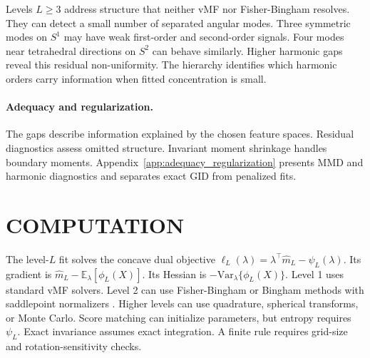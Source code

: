 \documentclass[twoside]{article}
\theoremstyle{definition}
\theoremstyle{remark}
\newcommand{\E}{\mathbb E}
\begin{document}
Levels $L\ge3$ address structure that neither vMF nor Fisher-Bingham resolves. They can detect a small number of separated angular modes. Three symmetric modes on $S^1$ may have weak first-order and second-order signals. Four modes near tetrahedral directions on $S^2$ can behave similarly. Higher harmonic gaps reveal this residual non-uniformity. The hierarchy identifies which harmonic orders carry information when fitted concentration is small.

\paragraph{Adequacy and regularization.}
The gaps describe information explained by the chosen feature spaces. Residual diagnostics assess omitted structure. Invariant moment shrinkage handles boundary moments. Appendix~\ref{app:adequacy_regularization} presents MMD and harmonic diagnostics and separates exact GID from penalized fits.


\section{COMPUTATION}\label{sec:computation}

The level-$L$ fit solves the concave dual objective $\ell_L(\lambda)=\lambda^\top\widehat m_L-\psi_L(\lambda)$. Its gradient is $\widehat m_L-\E_\lambda[\phi_L(X)]$. Its Hessian is $-\mathrm{Var}_\lambda\{\phi_L(X)\}$. Level 1 uses standard vMF solvers. Level 2 can use Fisher-Bingham or Bingham methods with saddlepoint normalizers \citep{kume_2005_SaddlepointApproximationsBingham}. Higher levels can use quadrature, spherical transforms, or Monte Carlo. Score matching can initialize parameters, but entropy requires $\psi_L$. Exact invariance assumes exact integration. A finite rule requires grid-size and rotation-sensitivity checks.
\end{document}
